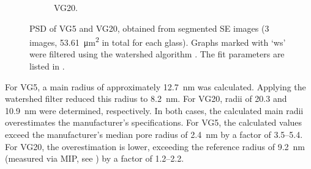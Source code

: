 \begin{figure}[htbp]
\begin{subfigure}{0.49\textwidth}
        \caption{\acs{VG20}.}
        \label{fig:compare_psd_20nm}
    \end{subfigure}
	\caption{
		\ac{PSD} of \acs{VG5} and \acs{VG20}, obtained from segmented \ac{SE} images (\num{3} images, \qty{53.61}{\micro\meter\squared} in total for each glass).
		Graphs marked with `ws' were filtered using the watershed algorithm \cite{beucher.1992}.
		The fit parameters are listed in .
	}
    \label{fig:compare_psd_vycor}
\end{figure}


For \acs{VG5}, a main radius of approximately \qty{12.7}{\nano\meter} was calculated.
Applying the watershed filter reduced this radius to \qty{8.2}{\nano\meter}.
For \acs{VG20}, radii of \num{20.3} and \qty{10.9}{\nano\meter} were determined, respectively.
In both cases, the calculated main radii overestimates the manufacturer's specifications.
For \acs{VG5}, the calculated values exceed the manufacturer's median pore radius of \qty{2.4}{\nano\meter} by a factor of \numrange{3.5}{5.4}.
For \acs{VG20}, the overestimation is lower, exceeding the reference radius of \qty{9.2}{\nano\meter} (measured via \ac{MIP}, see ) by a factor of \numrange{1.2}{2.2}.





